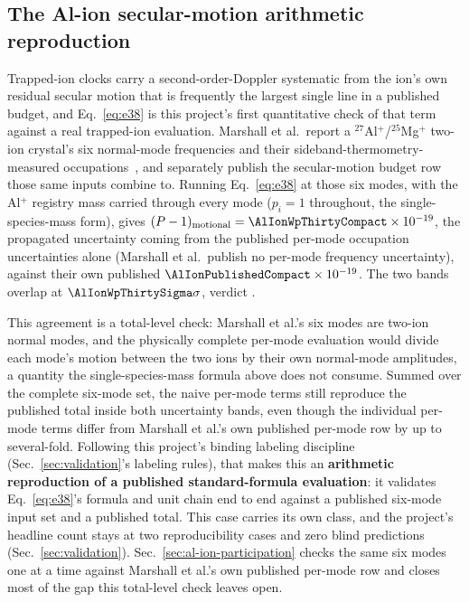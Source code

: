 \documentclass[aps,pra,superscriptaddress,groupedaddress,nofootinbib]{revtex4-2}
\begin{document}
\subsection{The Al-ion secular-motion arithmetic reproduction}
\label{sec:al-ion-arithmetic}

Trapped-ion clocks carry a second-order-Doppler systematic from the ion's
own residual secular motion that is frequently the largest single line in a
published budget, and Eq.~\eqref{eq:e38} is this project's first
quantitative check of that term against a real trapped-ion evaluation.
Marshall et al.\ report a $^{27}$Al$^+$/$^{25}$Mg$^+$ two-ion crystal's six
normal-mode frequencies and their sideband-thermometry-measured
occupations~\cite{Marshall2025}, and separately publish the secular-motion
budget row those same inputs combine to. Running Eq.~\eqref{eq:e38} at
those six modes, with the Al$^+$ registry mass carried through every mode
($p_i=1$ throughout, the single-species-mass form), gives
$(P-1)_{\rm motional}=\AlIonWpThirtyCompact\times10^{-19}$, the propagated
uncertainty coming from the published per-mode occupation uncertainties
alone (Marshall et al.\ publish no per-mode frequency uncertainty), against
their own published $\AlIonPublishedCompact\times10^{-19}$. The two bands
overlap at $\AlIonWpThirtySigma\sigma$, verdict \textit{\AlIonWpThirtyVerdict}.

This agreement is a total-level check: Marshall et al.'s six modes are
two-ion normal modes, and the physically complete per-mode evaluation would
divide each mode's motion between the two ions by their own normal-mode
amplitudes, a quantity the single-species-mass formula above does not
consume. Summed over the complete six-mode set, the
naive per-mode terms still reproduce the published total inside both
uncertainty bands, even though the individual per-mode terms differ from
Marshall et al.'s own published per-mode row by up to several-fold.
Following this project's binding labeling discipline
(Sec.~\ref{sec:validation}'s labeling rules), that makes this an
\textbf{arithmetic reproduction of a published standard-formula
evaluation}: it validates Eq.~\eqref{eq:e38}'s formula and unit chain end to
end against a published six-mode input set and a published total. This
case carries its own class, and the project's headline count stays at two
reproducibility cases and zero blind predictions
(Sec.~\ref{sec:validation}). Sec.~\ref{sec:al-ion-participation} checks the
same six modes one at a time against Marshall et al.'s own published
per-mode row and closes most of the gap this total-level check leaves open.
\end{document}
